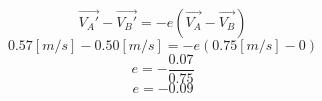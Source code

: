 \documentclass{jsarticle}
\begin{document}
\pagestyle{empty}
\large \[\vec{V_A'}-\vec{V_B'}=-e(\vec{V_A}-\vec{V_B})\]
\large \[0.57[m/s]-0.50[m/s]=-e(0.75[m/s]-0)\]
\large \[e=-\frac{0.07}{0.75}\]
\large \[e=-0.09\]
\end{document}
